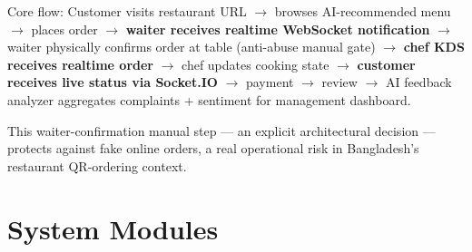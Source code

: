 Core flow: Customer visits restaurant URL $\rightarrow$ browses AI-recommended menu $\rightarrow$ places order $\rightarrow$ \textbf{waiter receives realtime WebSocket notification} $\rightarrow$ waiter physically confirms order at table (anti-abuse manual gate) $\rightarrow$ \textbf{chef KDS receives realtime order} $\rightarrow$ chef updates cooking state $\rightarrow$ \textbf{customer receives live status via Socket.IO} $\rightarrow$ payment $\rightarrow$ review $\rightarrow$ AI feedback analyzer aggregates complaints + sentiment for management dashboard.

This waiter-confirmation manual step --- an explicit architectural decision --- protects against fake online orders, a real operational risk in Bangladesh's restaurant QR-ordering context.

\section{System Modules}
\label{sec:modules}

